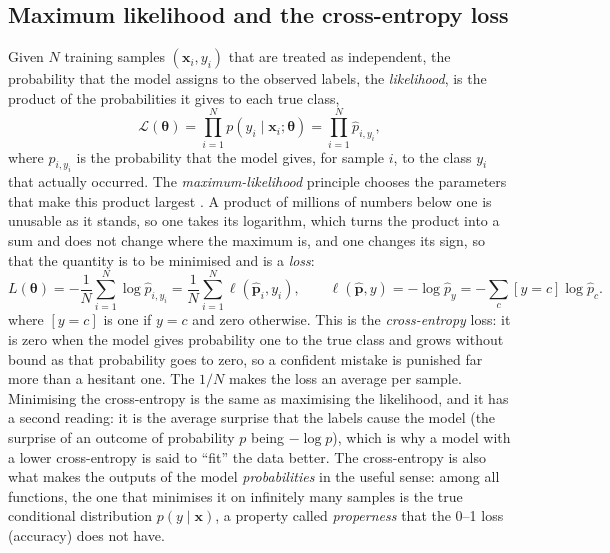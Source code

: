 \subsection{Maximum likelihood and the cross-entropy loss}
\label{sec:bg:learning:likelihood}

Given $N$ training samples $(\mathbf{x}_i, y_i)$ that are treated as independent, the
probability that the model assigns to the observed labels, the \emph{likelihood}, is the
product of the probabilities it gives to each true class,
\begin{equation}
  \mathcal{L}(\boldsymbol{\theta}) = \prod_{i=1}^{N} p(y_i \mid \mathbf{x}_i; \boldsymbol{\theta})
  = \prod_{i=1}^{N} \hat{p}_{i, y_i},
\end{equation}
where $\hat{p}_{i, y_i}$ is the probability that the model gives, for sample $i$, to the
class $y_i$ that actually occurred.  The \emph{maximum-likelihood} principle chooses the
parameters that make this product largest \cite{bishop2006prml}.  A product of millions
of numbers below one is unusable as it stands, so one takes its logarithm, which turns the
product into a sum and does not change where the maximum is, and one changes its sign, so
that the quantity is to be minimised and is a \emph{loss}:
\begin{equation}
  L(\boldsymbol{\theta}) = -\frac{1}{N} \sum_{i=1}^{N} \log \hat{p}_{i, y_i}
  = \frac{1}{N} \sum_{i=1}^{N} \ell(\hat{\mathbf{p}}_i, y_i),
  \qquad
  \ell(\hat{\mathbf{p}}, y) = -\log \hat{p}_{y} = -\sum_{c} [y = c] \log \hat{p}_c .
  \label{eq:xent}
\end{equation}
where $[y = c]$ is one if $y = c$ and zero otherwise.  This is the \emph{cross-entropy} loss: it is zero when the model gives probability one to
the true class and grows without bound as that probability goes to zero, so a confident
mistake is punished far more than a hesitant one.  The $1/N$ makes the loss an average
per sample.  Minimising the cross-entropy is the same as maximising the likelihood, and it
has a second reading: it is the average surprise that the labels cause the model (the
surprise of an outcome of probability $p$ being $-\log p$), which is why a model with a
lower cross-entropy is said to ``fit'' the data better.  The cross-entropy is also what makes the outputs of the model \emph{probabilities}
in the useful sense: among all functions, the one that minimises it on infinitely many
samples is the true conditional distribution $p(y \mid \mathbf{x})$, a property called
\emph{properness} that the 0--1 loss (accuracy) does not have.


